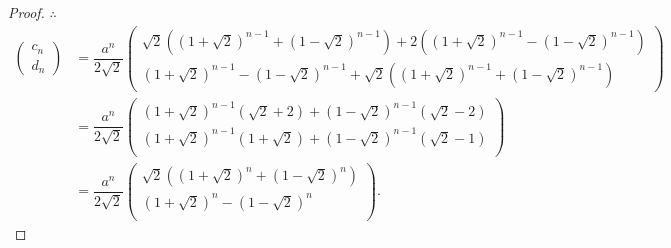 \documentclass[color=black,device=normal,lang=cn,mode=geye]{elegantnote}
\begin{document}
\begin{proof}
    $\therefore$
    \begin{align*}
        \begin{pmatrix}
            c_n \\ d_n
        \end{pmatrix} & =\dfrac{a^n}{2\sqrt{2}}\begin{pmatrix}
            \sqrt{2}((1+\sqrt{2})^{n-1}+(1-\sqrt{2})^{n-1})+2((1+\sqrt{2})^{n-1}-(1-\sqrt{2})^{n-1}) \\
            (1+\sqrt{2})^{n-1}-(1-\sqrt{2})^{n-1}+\sqrt{2}((1+\sqrt{2})^{n-1}+(1-\sqrt{2})^{n-1})
        \end{pmatrix} \\
        & =\dfrac{a^n}{2\sqrt{2}}\begin{pmatrix}
            (1+\sqrt{2})^{n-1}(\sqrt{2}+2)+(1-\sqrt{2})^{n-1}(\sqrt{2}-2) \\
            (1+\sqrt{2})^{n-1}(1+\sqrt{2})+(1-\sqrt{2})^{n-1}(\sqrt{2}-1) \\
        \end{pmatrix} \\
        & =\dfrac{a^n}{2\sqrt{2}}\begin{pmatrix}
            \sqrt{2}((1+\sqrt{2})^n+(1-\sqrt{2})^n) \\
            (1+\sqrt{2})^n-(1-\sqrt{2})^n \\
        \end{pmatrix}.
    \end{align*}


\end{proof}
\end{document}
